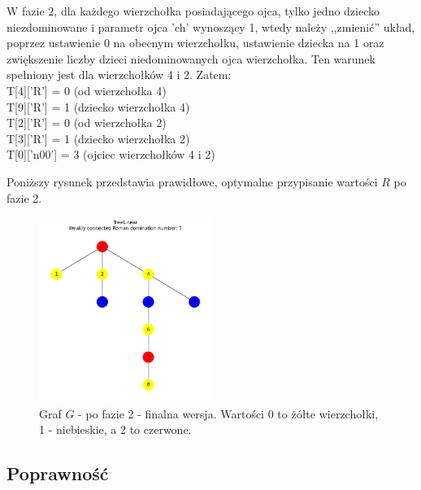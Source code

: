 W fazie 2, dla każdego wierzchołka posiadającego ojca, tylko jedno dziecko niezdominowane i parametr ojca 'ch' wynoszący 1, wtedy należy ,,zmienić'' układ, poprzez ustawienie 0 na obecnym wierzchołku, ustawienie dziecka na 1 oraz zwiększenie liczby dzieci niedominowanych ojca wierzchołka. 
Ten warunek spełniony jest dla wierzchołków 4 i 2. Zatem:\\
T[4]['R'] = 0  (od wierzchołka 4)\\
T[9]['R'] = 1  (dziecko wierzchołka 4)\\
T[2]['R'] = 0  (od wierzchołka 2)\\
T[3]['R'] = 1  (dziecko wierzchołka 2)\\
T[0]['n00'] = 3  (ojciec wierzchołków 4 i 2)

Poniższy rysunek przedstawia prawidłowe, optymalne przypisanie wartości $R$ po fazie 2.\\

\begin{figure}[H]
    \centering
    \includegraphics[width=0.5\textwidth]{assets/phase2.png}
    \caption{Graf $G$ - po fazie 2 - finalna wersja. Wartości 0 to żółte wierzchołki, 1 - niebieskie, a 2 to czerwone.}
    \label{fig:drzewoFaza2}
\end{figure}

\subsection{Poprawność}

